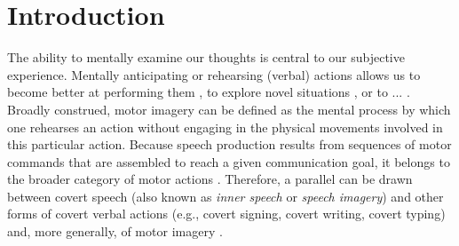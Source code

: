 \documentclass[utf8]{template/frontiersSCNS} %
\begin{document}
\newpage

\section{Introduction}


The ability to mentally examine our thoughts is central to our subjective experience. Mentally anticipating or rehearsing (verbal) actions allows us to become better at performing them \citep[e.g.,][]{toth2020}, to explore novel situations \citep{babar}, or to ... \citep{babar}. Broadly construed, motor imagery can be defined as the mental process by which one rehearses an action without engaging in the physical movements involved in this particular action. Because speech production results from sequences of motor commands that are assembled to reach a given communication goal, it belongs to the broader category of motor actions \citep{jeannerod_motor_2006}. Therefore, a parallel can be drawn between covert speech (also known as \textit{inner speech} or \textit{speech imagery}) and other forms of covert verbal actions (e.g., covert signing, covert writing, covert typing) and, more generally, of motor imagery \citep{alderson-day_inner_2015, perrone-bertolotti_what_2014, loevenbruck_cognitive_2018}.
\end{document}
